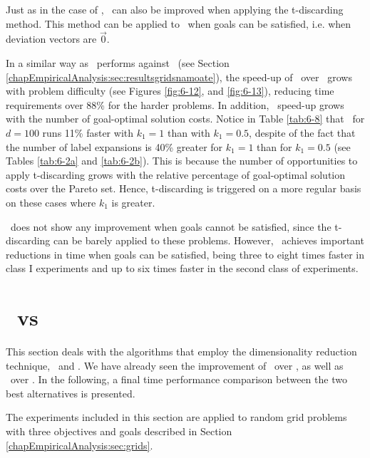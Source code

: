 Just as in the case of \namoa, \lexgo \ can also be improved when applying the t-discarding method. This method can be applied to \lexgo \ when goals can be satisfied, i.e. when deviation vectors are $\vec 0$.

In a similar way as \namoate \ performs against \namoa \ (see Section \ref{chapEmpiricalAnalysis:sec:resultsgridsnamoate}), the speed-up of \lexgote \ over \lexgo \ grows with problem difficulty (see Figures \ref{fig:6-12},  and \ref{fig:6-13}), reducing time requirements over 88\% for the harder problems. In addition, \lexgote \ speed-up grows with the number of goal-optimal solution costs. Notice in Table \ref{tab:6-8} that \lexgote \ for $d=100$ runs 11\% faster with $k_1= 1$ than with $k_1=0.5$, despite of the fact that the number of label expansions is 40\% greater for $k_1=1$ than for $k_1=0.5$ (see Tables \ref{tab:6-2a} and \ref{tab:6-2b}). This is because the number of opportunities to apply t-discarding grows with the relative percentage of goal-optimal solution costs over the Pareto set. Hence, t-discarding is triggered on a more regular basis on these cases where $k_1$ is greater.

\lexgote \ does not show any improvement when goals cannot be satisfied, since the t-discarding can be barely applied to these problems. However, \lexgo \ achieves important reductions in time when goals can be satisfied, being three to eight times faster in class I experiments and up to six times faster in the second class of experiments.

\section{\texorpdfstring{\lexgote}{LEXGO*dr} \ vs \texorpdfstring{\namoate}{NAMOA*dr}}
\label{chapEmpiricalAnalysis:sec:resultsgridsfinal}

This section deals with the algorithms that employ the dimensionality reduction technique, \namoate \ and \lexgote. We have already seen the improvement of \namoate \ over \namoa, as well as \lexgote \ over \lexgo. In the following, a final time performance comparison between the two best alternatives is presented.

The experiments included in this section are applied to random grid problems with three objectives and goals described in Section \ref{chapEmpiricalAnalysis:sec:grids}.


